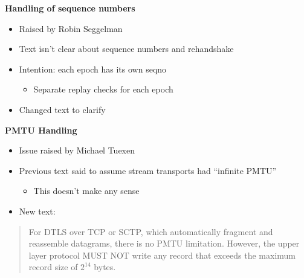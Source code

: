 \documentclass[helvetica]{seminar}
\newcommand{\heading}[1]{%
  \begin{center} 
    \large\bf 
    #1 
  \end{center} 
  \vspace{.4 in}}
\begin{document}
\begin{slide}
\heading{Handling of sequence numbers}

\begin{itemize}
\item Raised by Robin Seggelman
\item Text isn't clear about sequence numbers and rehandshake
\item Intention: each epoch has its own seqno 
\begin{itemize}
\item Separate replay checks for each epoch
\end{itemize}
\item Changed text to clarify
\end{itemize}
\end{slide}


\begin{slide}
\heading{PMTU Handling}

\begin{itemize}
\item Issue raised by Michael Tuexen
\item Previous text said to assume stream transports had ``infinite PMTU''
\begin{itemize}
\item This doesn't make any sense
\end{itemize}
\item New text:
\end{itemize}

\begin{quote}
For DTLS over TCP or SCTP, which automatically fragment
and reassemble datagrams, there is no PMTU limitation.
However, the upper layer protocol MUST NOT write any
record that exceeds the maximum record size of $2^{14}$ bytes.
\end{quote}
\end{slide}
\end{document}
